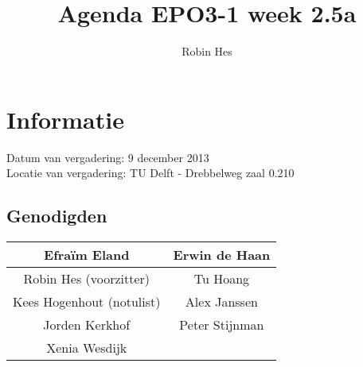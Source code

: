 \documentclass{article}
\begin{document}
\title{Agenda EPO3-1 week 2.5a}%
\author{Robin Hes}%
\maketitle

\section*{Informatie}
Datum van vergadering: 9 december 2013\\ %
Locatie van vergadering: TU Delft - Drebbelweg zaal 0.210 %
\subsection*{Genodigden}
\begin{center}
\begin{tabular}{|c |c |}
	\hline
	Efraïm Eland & Erwin de Haan \\
	\hline
	Robin Hes (voorzitter) & Tu Hoang \\
	\hline
	Kees Hogenhout (notulist) & Alex Janssen \\
	\hline
	Jorden Kerkhof & Peter Stijnman \\
	\hline
	Xenia Wesdijk & \\
	\hline
\end{tabular}
\end{center}
\end{document}
